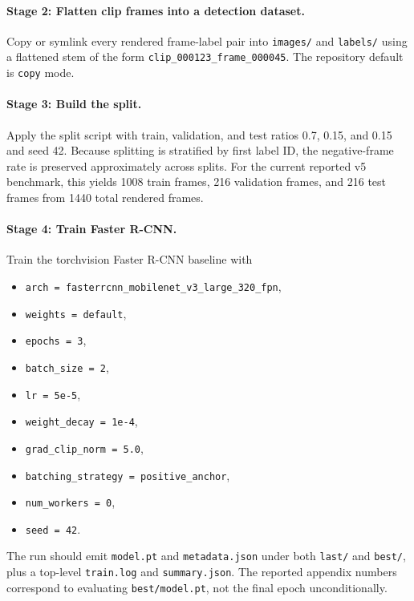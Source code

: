 \documentclass[11pt]{article}
\begin{document}
\paragraph{Stage 2: Flatten clip frames into a detection dataset.}
Copy or symlink every rendered frame-label pair into \texttt{images/} and \texttt{labels/} using a flattened stem of the form \texttt{clip\_000123\_frame\_000045}. The repository default is \texttt{copy} mode.

\paragraph{Stage 3: Build the split.}
Apply the split script with train, validation, and test ratios 0.7, 0.15, and 0.15 and seed 42. Because splitting is stratified by first label ID, the negative-frame rate is preserved approximately across splits. For the current reported v5 benchmark, this yields 1008 train frames, 216 validation frames, and 216 test frames from 1440 total rendered frames.

\paragraph{Stage 4: Train Faster R-CNN.}
Train the torchvision Faster R-CNN baseline with
\begin{itemize}[leftmargin=1.5em]
    \item \texttt{arch = fasterrcnn\_mobilenet\_v3\_large\_320\_fpn},
    \item \texttt{weights = default},
    \item \texttt{epochs = 3},
    \item \texttt{batch\_size = 2},
    \item \texttt{lr = 5e-5},
    \item \texttt{weight\_decay = 1e-4},
    \item \texttt{grad\_clip\_norm = 5.0},
    \item \texttt{batching\_strategy = positive\_anchor},
    \item \texttt{num\_workers = 0},
    \item \texttt{seed = 42}.
\end{itemize}
The run should emit \texttt{model.pt} and \texttt{metadata.json} under both \texttt{last/} and \texttt{best/}, plus a top-level \texttt{train.log} and \texttt{summary.json}. The reported appendix numbers correspond to evaluating \texttt{best/model.pt}, not the final epoch unconditionally.
\end{document}
